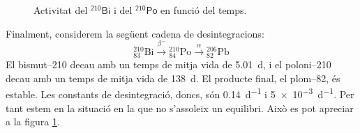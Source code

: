 \documentclass[12pt]{article}
\begin{document}
\begin{figure}[ht]
	\center
	
	\caption{Activitat del \( \mathsf{{}^{210}\text{Bi}} \) i del \( \mathsf{{}^{210}\text{Po}} \) en funció del temps.}
	\label{fig:no equilibri}
\end{figure}
Finalment, considerem la següent cadena de desintegracions:
\begin{equation*}
	{}^{210}_{83}\text{Bi} \xrightarrow{\beta^-} {}^{210}_{84}\text{Po} \xrightarrow{\alpha} {}^{206}_{82}\text{Pb}
\end{equation*}
El bismut--210 decau amb un temps de mitja vida de \SI{5.01}{d}, i el poloni--210 decau amb un temps de mitja vida de \SI{138}{d}. El producte final, el plom--82, és estable. Les constants de desintegració, doncs, són \SI{0,14}{d^{-1}} i \SI{5e-3}{d^{-1}}. Per tant estem en la situació en la que no s'assoleix un equilibri. Això es pot apreciar a la figura \ref{fig:no equilibri}.
\end{document}
